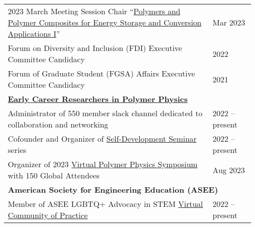\documentclass[letterpaper,11pt]{article}
\begin{document}
\begin{longtable}{@{}p{}l@{}}
  \hspace{3mm} 2023 March Meeting Session Chair ``\href{https://meetings.aps.org/Meeting/MAR23/Session/Y15}{Polymers and Polymer Composites for Energy Storage and Conversion Applications I}''                   & Mar 2023         \\
  \hspace{3mm} Forum on Diversity and Inclusion (FDI) Executive Committee Candidacy                                                                                                                               & 2022             \\
  \hspace{3mm} Forum of Graduate Student (FGSA) Affairs Executive Committee Candidacy                                                                                                                             & 2021             \\ [4pt]
  \multicolumn{2}{l}{\hspace{-3mm} \bf{\href{https://sites.google.com/view/polymerphysics/}{Early Career Researchers in Polymer Physics}}}                                                                                           \\
  \hspace{3mm} Administrator of 550 member slack channel dedicated to collaboration and networking                                                                                                                & 2022 -- present  \\
  \hspace{3mm} Cofounder and Organizer of \href{https://sites.google.com/view/polymerphysics/self-dev-seminars}{Self-Development Seminar} series                                                                  & 2022 -- present  \\
  \hspace{3mm} Organizer of 2023 \href{https://sites.google.com/view/polymerphysics/vpps-2023-schedule}{Virtual Polymer Physics Symposium} with 150 Global Attendees                                              & Aug 2023         \\ [4pt]
  \multicolumn{2}{l}{\hspace{-3mm} \bf{American Society for Engineering Education (ASEE)}}                                                                                                                                           \\
  \hspace{3mm} Member of ASEE LGBTQ+ Advocacy in STEM \href{https://lgbtq.asee.org/our-community/}{Virtual Community of Practice}                                                                                 & 2022 -- present  \\

\end{longtable}
\end{document}
